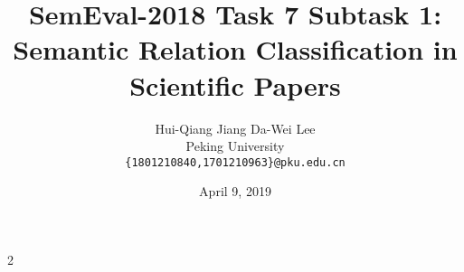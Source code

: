 \documentclass[12pt]{article}
\title{SemEval-2018 Task 7 Subtask 1: Semantic Relation Classification in Scientific Papers}
\author{Hui-Qiang Jiang \quad Da-Wei Lee \\
Peking University \\
{\tt \{1801210840,1701210963\}@pku.edu.cn}}
\date{April 9, 2019}
\begin{document}
\maketitle
\begin{abstract}
  
\end{abstract}

\begin{multicols}{2}







\end{multicols}{2}




\end{document}
